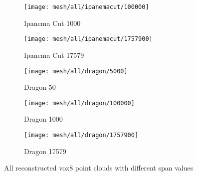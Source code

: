 \begin{figure}
    \begin{subfigure}{0.3\textwidth}
        \centering
        \texttt{[image: mesh/all/ipanemacut/100000]}
        \caption{Ipanema Cut 1000}
    \end{subfigure}
    \begin{subfigure}{0.3\textwidth}
        \centering
        \texttt{[image: mesh/all/ipanemacut/1757900]}
        \caption{Ipanema Cut 17579}
    \end{subfigure}
    \begin{subfigure}{0.3\textwidth}
        \centering
        \texttt{[image: mesh/all/dragon/5000]}
        \caption{Dragon 50}
    \end{subfigure}
    \begin{subfigure}{0.3\textwidth}
        \centering
        \texttt{[image: mesh/all/dragon/100000]}
        \caption{Dragon 1000}
    \end{subfigure}
    \begin{subfigure}{0.3\textwidth}
        \centering
        \texttt{[image: mesh/all/dragon/1757900]}
        \caption{Dragon 17579}
    \end{subfigure}
    \caption{All reconstructed vox8 point clouds with different span values}
\end{figure}

